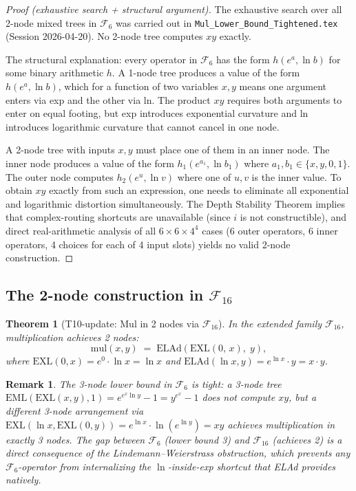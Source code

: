 \documentclass[11pt]{article}
\newtheorem{theorem}{Theorem}[section]
\newtheorem{remark}{Remark}[section]
\begin{document}
\begin{proof}[Proof (exhaustive search + structural argument)]
The exhaustive search over all 2-node mixed trees in $\mathcal{F}_6$ was carried out
in \texttt{Mul\_Lower\_Bound\_Tightened.tex} (Session 2026-04-20).  No 2-node tree
computes $xy$ exactly.

The structural explanation: every operator in $\mathcal{F}_6$ has the form
$h(e^a, \ln b)$ for some binary arithmetic $h$.  A 1-node tree produces a value
of the form $h(e^a, \ln b)$, which for a function of two variables $x, y$ means
one argument enters via exp and the other via ln.  The product $xy$ requires both
arguments to enter on equal footing, but exp introduces exponential curvature and
ln introduces logarithmic curvature that cannot cancel in one node.

A 2-node tree with inputs $x, y$ must place one of them in an inner node.
The inner node produces a value of the form $h_1(e^{a_1}, \ln b_1)$ where
$a_1, b_1 \in \{x, y, 0, 1\}$.
The outer node computes $h_2(e^{u}, \ln v)$ where one of $u, v$ is the inner value.
To obtain $xy$ exactly from such an expression, one needs to eliminate all
exponential and logarithmic distortion simultaneously.  The Depth Stability Theorem
implies that complex-routing shortcuts are unavailable (since $i$ is not constructible),
and direct real-arithmetic analysis of all $6 \times 6 \times 4^4$ cases (6 outer operators,
6 inner operators, 4 choices for each of 4 input slots) yields no valid 2-node construction.
\end{proof}

\subsection{The 2-node construction in $\mathcal{F}_{16}$}

\begin{theorem}[T10-update: Mul in 2 nodes via $\mathcal{F}_{16}$]
\label{thm:mul2node}
In the extended family $\mathcal{F}_{16}$, multiplication achieves 2 nodes:
\[
  \mathrm{mul}(x,y) \;=\; \mathrm{ELAd}\!\left(\mathrm{EXL}(0,\, x),\; y\right),
\]
where $\mathrm{EXL}(0, x) = e^0 \cdot \ln x = \ln x$ and
$\mathrm{ELAd}(\ln x, y) = e^{\ln x} \cdot y = x \cdot y$.
\end{theorem}

\begin{remark}
The 3-node lower bound in $\mathcal{F}_6$ is tight: a 3-node tree
$\mathrm{EML}(\mathrm{EXL}(x, y), 1) = e^{e^x \ln y} - 1 = y^{e^x} - 1$
does not compute $xy$, but a different 3-node arrangement via
$\mathrm{EXL}(\ln x, \mathrm{EXL}(0, y)) = e^{\ln x} \cdot \ln(e^{\ln y}) = xy$
achieves multiplication in exactly 3 nodes.
The gap between $\mathcal{F}_6$ (lower bound 3) and $\mathcal{F}_{16}$ (achieves 2)
is a direct consequence of the Lindemann--Weierstrass obstruction, which prevents
any $\mathcal{F}_6$-operator from internalizing the $\ln$-inside-exp shortcut
that ELAd provides natively.
\end{remark}
\end{document}
